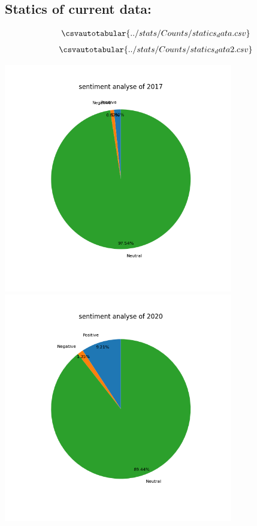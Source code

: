 \documentclass[a4paper]{article}
\begin{document}
\subsection{Statics of current data:}
\begin{align*}
	\csvautotabular{../stats/Counts/statics_data.csv}
\end{align*} 
\begin{align*}
	\csvautotabular{../stats/Counts/statics_data2.csv}
\end{align*} 
\bigskip

\pagebreak
\includegraphics[width=0.75\textwidth]{../stats/Counts/sentimentchart2017.png}\\
\includegraphics[width=0.75\textwidth]{../stats/Counts/sentimentchart2020.png}\\
\end{document}
